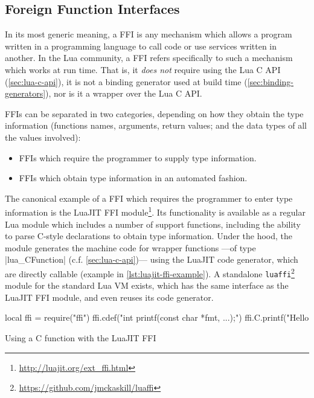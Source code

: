 \subsection{Foreign Function Interfaces}
	\label{sec:ffis}

In its most generic meaning, a \gls{FFI} is any mechanism which allows
a program written in a programming language to call code or use services
written in another. In the Lua community, a FFI refers specifically to such
a mechanism which works at run time. That is, it \emph{does not} require using
the Lua C API (\autoref{sec:lua-c-api}), it is not a binding generator used at
build time (\autoref{sec:binding-generators}), nor is it a wrapper over the
Lua C API.

FFIs can be separated in two categories, depending on how they obtain the type
information (functions names, arguments, return values; and the data types of
all the values involved):

\begin{itemize}

	\item FFIs which require the programmer to supply type information.

	\item FFIs which obtain type information in an automated fashion.

\end{itemize}

The canonical example of a FFI which requires the programmer to enter type
information is the \gls{LuaJIT} FFI
module\footnote{\url{http://luajit.org/ext_ffi.html}}. Its functionality is
available as a regular Lua module which includes a number of support
functions, including the ability to parse C-style declarations to obtain type
information. Under the hood, the module generates the machine code for wrapper
functions —of type \Mc|lua_CFunction| (c.f. \autoref{sec:lua-c-api})— using
the LuaJIT code generator, which are directly callable (example in
\autoref{lst:luajit-ffi-example}). A standalone
\verb|luaffi|\footnote{\url{https://github.com/jmckaskill/luaffi}} module for
the standard Lua \gls{VM} exists, which has the same interface as the LuaJIT
FFI module, and even reuses its code generator.

\begin{listing}[H]
	\begin{luacode}
  local ffi = require("ffi")
  ffi.cdef("int printf(const char *fmt, ...);")
  ffi.C.printf("Hello %
	\end{luacode}
	\caption{Using a C function with the LuaJIT FFI}
	\label{lst:luajit-ffi-example}
\end{listing}

